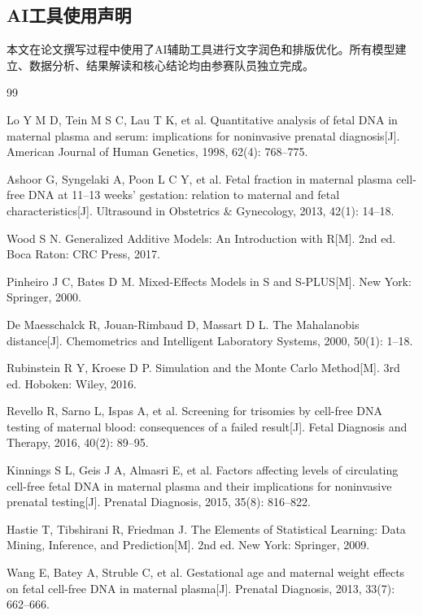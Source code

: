 \subsection*{AI工具使用声明}

本文在论文撰写过程中使用了AI辅助工具进行文字润色和排版优化。所有模型建立、数据分析、结果解读和核心结论均由参赛队员独立完成。

\newpage

\begin{thebibliography}{99}

Lo Y M D, Tein M S C, Lau T K, et al. Quantitative analysis of fetal DNA in maternal plasma and serum: implications for noninvasive prenatal diagnosis[J]. American Journal of Human Genetics, 1998, 62(4): 768--775.

Ashoor G, Syngelaki A, Poon L C Y, et al. Fetal fraction in maternal plasma cell-free DNA at 11--13 weeks' gestation: relation to maternal and fetal characteristics[J]. Ultrasound in Obstetrics \& Gynecology, 2013, 42(1): 14--18.

Wood S N. Generalized Additive Models: An Introduction with R[M]. 2nd ed. Boca Raton: CRC Press, 2017.

Pinheiro J C, Bates D M. Mixed-Effects Models in S and S-PLUS[M]. New York: Springer, 2000.

De Maesschalck R, Jouan-Rimbaud D, Massart D L. The Mahalanobis distance[J]. Chemometrics and Intelligent Laboratory Systems, 2000, 50(1): 1--18.

Rubinstein R Y, Kroese D P. Simulation and the Monte Carlo Method[M]. 3rd ed. Hoboken: Wiley, 2016.

Revello R, Sarno L, Ispas A, et al. Screening for trisomies by cell-free DNA testing of maternal blood: consequences of a failed result[J]. Fetal Diagnosis and Therapy, 2016, 40(2): 89--95.

Kinnings S L, Geis J A, Almasri E, et al. Factors affecting levels of circulating cell-free fetal DNA in maternal plasma and their implications for noninvasive prenatal testing[J]. Prenatal Diagnosis, 2015, 35(8): 816--822.

Hastie T, Tibshirani R, Friedman J. The Elements of Statistical Learning: Data Mining, Inference, and Prediction[M]. 2nd ed. New York: Springer, 2009.

Wang E, Batey A, Struble C, et al. Gestational age and maternal weight effects on fetal cell-free DNA in maternal plasma[J]. Prenatal Diagnosis, 2013, 33(7): 662--666.

\end{thebibliography}
